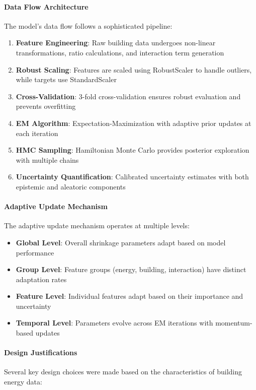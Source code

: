 \paragraph{Data Flow Architecture}
The model's data flow follows a sophisticated pipeline:
\begin{enumerate}
    \item \textbf{Feature Engineering}: Raw building data undergoes non-linear transformations, ratio calculations, and interaction term generation
    \item \textbf{Robust Scaling}: Features are scaled using RobustScaler to handle outliers, while targets use StandardScaler
    \item \textbf{Cross-Validation}: 3-fold cross-validation ensures robust evaluation and prevents overfitting
    \item \textbf{EM Algorithm}: Expectation-Maximization with adaptive prior updates at each iteration
    \item \textbf{HMC Sampling}: Hamiltonian Monte Carlo provides posterior exploration with multiple chains
    \item \textbf{Uncertainty Quantification}: Calibrated uncertainty estimates with both epistemic and aleatoric components
\end{enumerate}

\paragraph{Adaptive Update Mechanism}
The adaptive update mechanism operates at multiple levels:
\begin{itemize}
    \item \textbf{Global Level}: Overall shrinkage parameters adapt based on model performance
    \item \textbf{Group Level}: Feature groups (energy, building, interaction) have distinct adaptation rates
    \item \textbf{Feature Level}: Individual features adapt based on their importance and uncertainty
    \item \textbf{Temporal Level}: Parameters evolve across EM iterations with momentum-based updates
\end{itemize}

\paragraph{Design Justifications}
Several key design choices were made based on the characteristics of building energy data:

